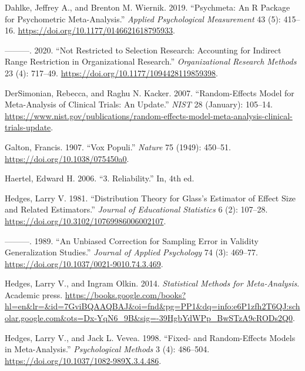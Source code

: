 \documentclass[
  letterpaper,
  DIV=11,
  numbers=noendperiod]{scrreprt}
\newlength{\cslhangindent}
\newlength{\cslentryspacingunit} %
\newenvironment{CSLReferences}[2] %
 {%
  \setlength{\parindent}{0pt}
  \ifodd #1
  \let\oldpar\par
  \def\par{\hangindent=\cslhangindent\oldpar}
  \fi
  \setlength{\parskip}{#2\cslentryspacingunit}
 }%
 {}
\begin{document}
\begin{CSLReferences}{1}{0}
\leavevmode{}%
Dahlke, Jeffrey A., and Brenton M. Wiernik. 2019. {``Psychmeta: An R
Package for Psychometric Meta-Analysis.''} \emph{Applied Psychological
Measurement} 43 (5): 415--16.
\url{https://doi.org/10.1177/0146621618795933}.

\leavevmode{}%
---------. 2020. {``Not Restricted to Selection Research: Accounting for
Indirect Range Restriction in Organizational Research.''}
\emph{Organizational Research Methods} 23 (4): 717--49.
\url{https://doi.org/10.1177/1094428119859398}.

\leavevmode{}%
DerSimonian, Rebecca, and Raghu N. Kacker. 2007. {``Random-Effects Model
for Meta-Analysis of Clinical Trials: An Update.''} \emph{NIST} 28
(January): 105--14.
\url{https://www.nist.gov/publications/random-effects-model-meta-analysis-clinical-trials-update}.

\leavevmode{}%
Galton, Francis. 1907. {``Vox Populi.''} \emph{Nature} 75 (1949):
450--51. \url{https://doi.org/10.1038/075450a0}.

\leavevmode{}%
Haertel, Edward H. 2006. {``3. Reliability.''} In, 4th ed.

\leavevmode{}%
Hedges, Larry V. 1981. {``Distribution Theory for Glass's Estimator of
Effect Size and Related Estimators.''} \emph{Journal of Educational
Statistics} 6 (2): 107--28.
\url{https://doi.org/10.3102/10769986006002107}.

\leavevmode{}%
---------. 1989. {``An Unbiased Correction for Sampling Error in
Validity Generalization Studies.''} \emph{Journal of Applied Psychology}
74 (3): 469--77. \url{https://doi.org/10.1037/0021-9010.74.3.469}.

\leavevmode{}%
Hedges, Larry V., and Ingram Olkin. 2014. \emph{Statistical Methods for
Meta-Analysis}. Academic press.
\url{https://books.google.com/books?hl=en\&lr=\&id=7GviBQAAQBAJ\&oi=fnd\&pg=PP1\&dq=info:e6P1zfh2T6QJ:scholar.google.com\&ots=Dx-YqN6_9B\&sig=-39HgbYdWPp_BwSTzA9cRODs2Q0}.

\leavevmode{}%
Hedges, Larry V., and Jack L. Vevea. 1998. {``Fixed- and Random-Effects
Models in Meta-Analysis.''} \emph{Psychological Methods} 3 (4):
486--504. \url{https://doi.org/10.1037/1082-989X.3.4.486}.


\end{CSLReferences}
\end{document}
